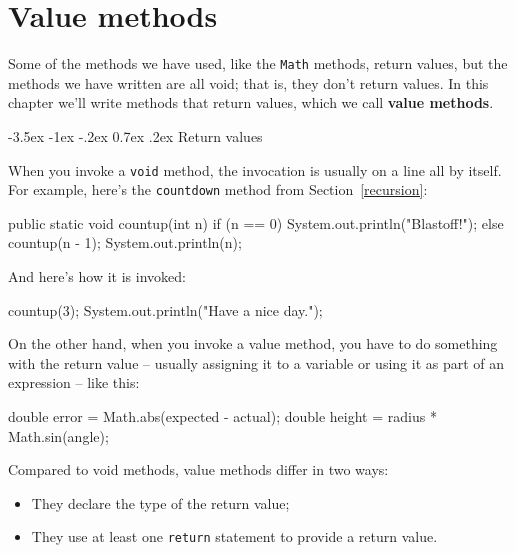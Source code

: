 \documentclass[12pt]{book}
\makeatletter
\theoremstyle{exercise}
\newcommand{\java}[1]{\verb"#1"}
\renewcommand{\section}{\@startsection{section}{1}{\z@}%
    {-3.5ex \@plus -1ex \@minus -.2ex}%
    {0.7ex \@plus.2ex}%
    {\normalfont\Large\bfseries}}
\newcommand{\java}[1]{\lstinline{#1}} %
\makeatother
\begin{document}
\chapter{Value methods}


Some of the methods we have used, like the \java{Math} methods, return values, but the methods we have written are all void; that is, they don't return values.
In this chapter we'll write methods that return values, which we call {\bf value methods}.


\section{Return values}


When you invoke a \java{void} method, the invocation is usually on a line all by itself.
For example, here's the \java{countdown} method from Section~\ref{recursion}:

\begin{code}
    public static void countup(int n) {
        if (n == 0) {
            System.out.println("Blastoff!");
        } else {
            countup(n - 1);
            System.out.println(n);
        }
    }
\end{code}

And here's how it is invoked:

\begin{code}
    countup(3);
    System.out.println("Have a nice day.");
\end{code}

On the other hand, when you invoke a value method, you have to do something with the return value -- usually assigning it to a variable or using it as
part of an expression -- like this: 

\begin{code}
    double error = Math.abs(expected - actual);
    double height = radius * Math.sin(angle);
\end{code}


Compared to void methods, value methods differ in two ways:

\begin{itemize}

\item They declare the type of the return value;

\item They use at least one \java{return} statement to provide a return value.

\end{itemize}
\end{document}
